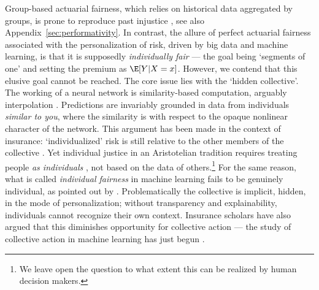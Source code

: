 \documentclass[11pt]{article} %
\begin{document}
Group-based actuarial fairness, which relies on historical data aggregated by groups, is prone to reproduce past injustice \citep{daniels1990insurability,lehtonen2015producing}, see also  Appendix~\ref{sec:performativity}. In contrast, the allure of perfect actuarial fairness associated with the personalization of risk, driven by big data and machine learning, is that it is supposedly \textit{individually fair} --- the goal being `segments of one' and setting the premium as $\E[Y|X=x]$. However, we contend that this elusive goal cannot be reached.
The core issue lies with the `hidden collective'. The working of a neural network is similarity-based computation, arguably interpolation \citep{hasson2020direct}. Predictions are invariably grounded in data from individuals \textit{similar to you}, where the similarity is with respect to the opaque nonlinear character of the network. This argument has been made in the context of insurance: `individualized' risk is still relative to the other members of the collective \citep{tanninen2020contested,prainsack2020shifting}. Yet individual justice in an Aristotelian tradition requires treating people \textit{as individuals} \citep{thiery2006fairness,jorgensen2022algorithms}, not based on the data of others.\footnote{We leave open the question to what extent this can be realized by human decision makers.} For the same reason, what is called \textit{individual fairness} in machine learning fails to be genuinely individual, as pointed out by \citet{binns2020apparent}. Problematically the collective is implicit, hidden, in the mode of personalization; without transparency and explainability, individuals cannot recognize their own context. Insurance scholars have also argued that this diminishes opportunity for collective action \citep{moor2018price,mcfall2018or,krippner2022person} --- the study of collective action in machine learning has just begun \citep{hardt2023algorithmic}.
\end{document}
